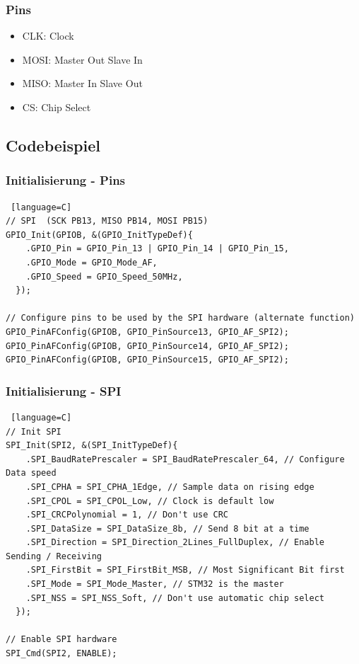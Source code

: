 \documentclass[ngerman,compress]{beamer}
\begin{document}
\begin{frame} [fragile]
	\frametitle{Pins}
	\begin{itemize}
		\item CLK: Clock
		\item MOSI: Master Out Slave In
		\item MISO: Master In Slave Out
		\item CS: Chip Select
	\end{itemize}
\end{frame}



\subsection{Codebeispiel}

\begin{frame} [fragile]
	\frametitle{Initialisierung - Pins}
	\begin{lstlisting} [language=C]
// SPI  (SCK PB13, MISO PB14, MOSI PB15)
GPIO_Init(GPIOB, &(GPIO_InitTypeDef){
    .GPIO_Pin = GPIO_Pin_13 | GPIO_Pin_14 | GPIO_Pin_15,
    .GPIO_Mode = GPIO_Mode_AF,
    .GPIO_Speed = GPIO_Speed_50MHz,
  });

// Configure pins to be used by the SPI hardware (alternate function)
GPIO_PinAFConfig(GPIOB, GPIO_PinSource13, GPIO_AF_SPI2);
GPIO_PinAFConfig(GPIOB, GPIO_PinSource14, GPIO_AF_SPI2);
GPIO_PinAFConfig(GPIOB, GPIO_PinSource15, GPIO_AF_SPI2);
	\end{lstlisting}
\end{frame}

\begin{frame} [fragile]
	\frametitle{Initialisierung - SPI}
	\begin{lstlisting} [language=C]
// Init SPI
SPI_Init(SPI2, &(SPI_InitTypeDef){
    .SPI_BaudRatePrescaler = SPI_BaudRatePrescaler_64, // Configure Data speed
    .SPI_CPHA = SPI_CPHA_1Edge, // Sample data on rising edge
    .SPI_CPOL = SPI_CPOL_Low, // Clock is default low
    .SPI_CRCPolynomial = 1, // Don't use CRC
    .SPI_DataSize = SPI_DataSize_8b, // Send 8 bit at a time
    .SPI_Direction = SPI_Direction_2Lines_FullDuplex, // Enable Sending / Receiving
    .SPI_FirstBit = SPI_FirstBit_MSB, // Most Significant Bit first
    .SPI_Mode = SPI_Mode_Master, // STM32 is the master
    .SPI_NSS = SPI_NSS_Soft, // Don't use automatic chip select
  });

// Enable SPI hardware
SPI_Cmd(SPI2, ENABLE);
	\end{lstlisting}
\end{frame}
\end{document}
